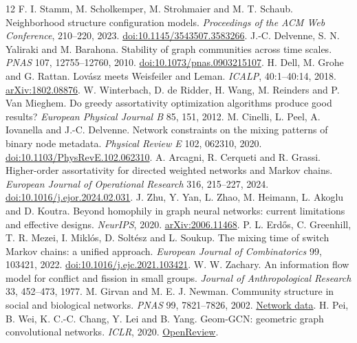 \documentclass[11pt]{article}
\begin{document}
\begin{thebibliography}{12}
 F. I. Stamm, M. Scholkemper, M. Strohmaier and M. T. Schaub. Neighborhood structure configuration models. \emph{Proceedings of the ACM Web Conference}, 210--220, 2023. \href{https://doi.org/10.1145/3543507.3583266}{doi:10.1145/3543507.3583266}.
 J.-C. Delvenne, S. N. Yaliraki and M. Barahona. Stability of graph communities across time scales. \emph{PNAS} 107, 12755--12760, 2010. \href{https://doi.org/10.1073/pnas.0903215107}{doi:10.1073/pnas.0903215107}.
 H. Dell, M. Grohe and G. Rattan. Lov\'asz meets Weisfeiler and Leman. \emph{ICALP}, 40:1--40:14, 2018. \href{https://arxiv.org/abs/1802.08876}{arXiv:1802.08876}.
 W. Winterbach, D. de Ridder, H. Wang, M. Reinders and P. Van Mieghem. Do greedy assortativity optimization algorithms produce good results? \emph{European Physical Journal B} 85, 151, 2012.
 M. Cinelli, L. Peel, A. Iovanella and J.-C. Delvenne. Network constraints on the mixing patterns of binary node metadata. \emph{Physical Review E} 102, 062310, 2020. \href{https://doi.org/10.1103/PhysRevE.102.062310}{doi:10.1103/PhysRevE.102.062310}.
 A. Arcagni, R. Cerqueti and R. Grassi. Higher-order assortativity for directed weighted networks and Markov chains. \emph{European Journal of Operational Research} 316, 215--227, 2024. \href{https://doi.org/10.1016/j.ejor.2024.02.031}{doi:10.1016/j.ejor.2024.02.031}.
 J. Zhu, Y. Yan, L. Zhao, M. Heimann, L. Akoglu and D. Koutra. Beyond homophily in graph neural networks: current limitations and effective designs. \emph{NeurIPS}, 2020. \href{https://arxiv.org/abs/2006.11468}{arXiv:2006.11468}.
 P. L. Erd\H os, C. Greenhill, T. R. Mezei, I. Mikl\'os, D. Solt\'esz and L. Soukup. The mixing time of switch Markov chains: a unified approach. \emph{European Journal of Combinatorics} 99, 103421, 2022. \href{https://doi.org/10.1016/j.ejc.2021.103421}{doi:10.1016/j.ejc.2021.103421}.
 W. W. Zachary. An information flow model for conflict and fission in small groups. \emph{Journal of Anthropological Research} 33, 452--473, 1977.
 M. Girvan and M. E. J. Newman. Community structure in social and biological networks. \emph{PNAS} 99, 7821--7826, 2002. \href{https://websites.umich.edu/~mejn/netdata/}{Network data}.
 H. Pei, B. Wei, K. C.-C. Chang, Y. Lei and B. Yang. Geom-GCN: geometric graph convolutional networks. \emph{ICLR}, 2020. \href{https://openreview.net/forum?id=S1e2agrFvS}{OpenReview}.
\end{thebibliography}
\end{document}
